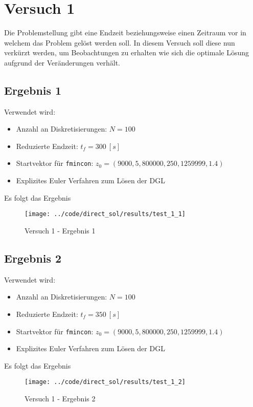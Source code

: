 \newpage
\section{Versuch 1}\label{kap:Versuch1}
Die Problemstellung gibt eine Endzeit beziehungsweise einen Zeitraum vor in welchem das Problem gelöst werden soll. In diesem Versuch soll diese nun verkürzt werden, um Beobachtungen zu erhalten wie sich die optimale Lösung aufgrund der Veränderungen verhält. %

\subsection{Ergebnis 1}\label{kap:Versuch11}
Verwendet wird:
\begin{itemize}
\item Anzahl an Diskretisierungen: $N = 100$ 
\item Reduzierte Endzeit: $t_f = 300 \ [s]$
\item Startvektor für \texttt{fmincon}: $z_0 = (9000,5,800000,250,1259999,1.4)$
\item Explizites Euler Verfahren zum Lösen der DGL
\end{itemize}
Es folgt das Ergebnis
\begin{figure}[H]
\begin{center}
\texttt{[image: ../code/direct\_sol/results/test\_1\_1]}
\caption{Versuch 1 - Ergebnis 1}\label{img:test_1_1}
\end{center}
\end{figure}

\newpage
\subsection{Ergebnis 2}\label{kap:Versuch12}
Verwendet wird:
\begin{itemize}
\item Anzahl an Diskretisierungen: $N = 100$ 
\item Reduzierte Endzeit: $t_f = 350 \ [s]$
\item Startvektor für \texttt{fmincon}: $z_0 = (9000,5,800000,250,1259999,1.4)$
\item Explizites Euler Verfahren zum Lösen der DGL
\end{itemize}
Es folgt das Ergebnis
\begin{figure}[H]
\begin{center}
\texttt{[image: ../code/direct\_sol/results/test\_1\_2]}
\caption{Versuch 1 - Ergebnis 2}\label{img:test_1_2}
\end{center}
\end{figure}


